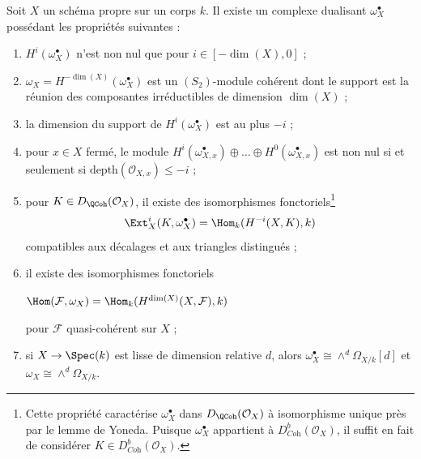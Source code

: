 \begin{lemma}
\label{lemma-duality-proper-over-field}
Soit $X$ un schéma propre sur un corps $k$. Il existe un complexe dualisant $\omega_X^\bullet$ possédant les propriétés suivantes :
\begin{enumerate}
\item $H^i(\omega_X^\bullet)$ n'est non nul que pour $i \in [-\dim(X), 0]$ ;
\item $\omega_X = H^{-\dim(X)}(\omega_X^\bullet)$ est un $(S_2)$-module cohérent dont le support est la réunion des composantes irréductibles de dimension $\dim(X)$ ;
\item la dimension du support de $H^i(\omega_X^\bullet)$ est au plus $-i$ ;
\item pour $x \in X$ fermé, le module
$H^i(\omega_{X, x}^\bullet) \oplus \ldots \oplus H^0(\omega_{X, x}^\bullet)$
est non nul si et seulement si $\text{depth}(\mathcal{O}_{X, x}) \leq -i$ ;
\item pour $K \in D_\QCoh(\mathcal{O}_X)$, il existe des isomorphismes fonctoriels\footnote{Cette propriété caractérise $\omega_X^\bullet$ dans $D_\QCoh(\mathcal{O}_X)$ à isomorphisme unique près par le lemme de Yoneda. Puisque $\omega_X^\bullet$ appartient à $D^b_{\textit{Coh}}(\mathcal{O}_X)$, il suffit en fait de considérer $K \in D^b_{\textit{Coh}}(\mathcal{O}_X)$.}
\begingroup\small
$$
\Ext^i_X(K, \omega_X^\bullet) = \Hom_k(H^{-i}(X, K), k)
$$
\endgroup
compatibles aux décalages et aux triangles distingués ;
\item il existe des isomorphismes fonctoriels
\par\noindent\hfil
$\Hom(\mathcal{F}, \omega_X) = \Hom_k(H^{\dim(X)}(X, \mathcal{F}), k)$
\hfil\par\noindent
pour $\mathcal{F}$ quasi-cohérent sur $X$ ;
\item si $X \to \Spec(k)$ est lisse de dimension relative $d$, alors $\omega_X^\bullet \cong \wedge^d\Omega_{X/k}[d]$ et $\omega_X \cong \wedge^d\Omega_{X/k}$.
\end{enumerate}
\end{lemma}

